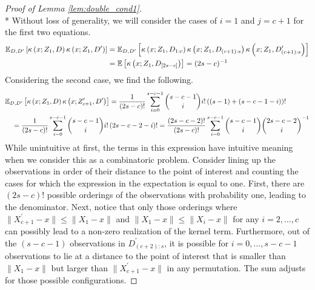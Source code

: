 \begin{proof}[Proof of Lemma \ref{lem:double_cond1}]\mbox{}\\*
    Without loss of generality, we will consider the cases of $i = 1$ and $j = c + 1$ for the first two equations.
    \begin{equation}
        \begin{aligned}
            \mathbb{E}_{D, D^{\prime}}\left[\kappa\left(x; Z_{1}, D\right)\kappa\left(x; Z_{1}, D^{\prime}\right)\right]
            & = \mathbb{E}_{D, D^{\prime}}\left[\kappa\left(x; Z_{1}, D_{1:c}\right)\kappa\left(x; Z_{1}, D_{(c+1):s}\right)\kappa\left(x; Z_{1}, D^{\prime}_{(c+1):s}\right)\right]\\
            & = \mathbb{E}\left[\kappa\left(x; Z_{1}, D_{[2s - c]}\right)\right]
            = (2s - c)^{-1}
        \end{aligned}
    \end{equation}
    Considering the second case, we find the following.
    \begin{equation}
        \begin{aligned}
            & \mathbb{E}_{D, D^{\prime}}\left[\kappa\left(x; Z_{1}, D\right)\kappa\left(x; Z_{c+1}^{\prime}, D^{\prime}\right)\right]
            = \frac{1}{(2s - c)!} \sum_{i = 0}^{s - c - 1}\binom{s - c - 1}{i} i! \left((s - 1) + (s - c - 1 - i)\right)! \\
            & \quad = \frac{1}{(2s - c)!}\sum_{i = 0}^{s - c - 1}\binom{s - c - 1}{i} i! \left(2s - c - 2 - i\right)! 
            = \frac{(2s - c - 2)!}{(2s - c)!}\sum_{i = 0}^{s - c - 1}\binom{s - c - 1}{i}\binom{2s - c - 2}{i}^{-1}
        \end{aligned}
    \end{equation}
    While unintuitive at first, the terms in this expression have intuitive meaning when we consider this as a combinatoric problem.
    Consider lining up the observations in order of their distance to the point of interest and counting the cases for which the expression in the expectation is equal to one.
    First, there are $(2s-c)!$ possible orderings of the observations with probability one, leading to the denominator.
    Next, notice that only those orderings where $\|X_{c+1}^{\prime} - x\| \leq \|X_{1}-x\|$ and $\|X_{1} - x\| \leq \|X_{i} - x\|$ for any $i = 2, \dotsc, c$ can possibly lead to a non-zero realization of the kernel term.
    Furthermore, out of the $(s-c-1)$ observations in $D^{\prime}_{(c+2):s}$, it is possible for $i = 0, \dotsc, s-c-1$ observations to lie at a distance to the point of interest that is smaller than $\|X_{1}-x\|$ but larger than $\|X_{c+1}^{\prime} - x\|$ in any permutation.
    The sum adjusts for those possible configurations.
    

\end{proof}
